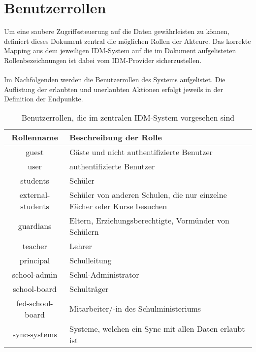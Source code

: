 \section{Benutzerrollen}
\label{Benutzerrollen}
Um eine saubere Zugriffssteuerung auf die Daten gewährleisten zu können, definiert dieses Dokument zentral die möglichen Rollen der Akteure. 
Das korrekte Mapping aus dem jeweiligen IDM-System auf die im Dokument aufgelisteten Rollenbezeichnungen ist dabei vom IDM-Provider sicherzustellen.\\
\\
Im Nachfolgenden werden die Benutzerrollen des Systems aufgelistet. 
Die Auflistung der erlaubten und unerlaubten Aktionen erfolgt jeweils in der Definition der Endpunkte.


\begin{table}[htb]
	\begin{tabularx}{\textwidth}{|c|X|}
		\hline
\textbf{Rollenname} & \textbf{Beschreibung der Rolle} \\ \hline
guest & Gäste und nicht authentifizierte Benutzer \\ \hline
user & authentifizierte Benutzer \\ \hline
students & Schüler \\ \hline
external-students & Schüler von anderen Schulen, die nur einzelne Fächer oder Kurse besuchen \\ \hline
guardians & Eltern, Erziehungsberechtigte, Vormünder von Schülern \\ \hline
teacher & Lehrer \\ \hline
principal & Schulleitung \\ \hline
school-admin & Schul-Administrator \\ \hline
school-board & Schulträger \\ \hline
fed-school-board & Mitarbeiter/-in des Schulministeriums \\ \hline
sync-systems & Systeme, welchen ein Sync mit allen Daten erlaubt ist \\ \hline

	\end{tabularx}

		\caption{Benutzerrollen, die im zentralen IDM-System vorgesehen sind}
		\label{tab:intro:roles}
\end{table}